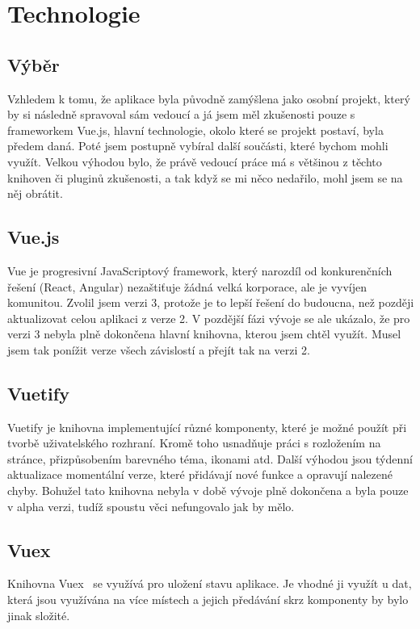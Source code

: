 
\chapter{Technologie}

\section{Výběr}
Vzhledem k tomu, že aplikace byla původně zamýšlena jako osobní projekt, který by si následně spravoval sám vedoucí a já
jsem měl zkušenosti pouze s frameworkem Vue.js, hlavní technologie, okolo které se projekt postaví, byla předem daná. Poté
jsem postupně vybíral další součásti, které bychom mohli využít. Velkou výhodou bylo, že právě vedoucí práce má s většinou
z těchto knihoven či pluginů zkušenosti, a tak když se mi něco nedařilo, mohl jsem se na něj obrátit.

\section{Vue.js}
Vue je progresivní JavaScriptový framework, který narozdíl od konkurenčních řešení (React, Angular) nezaštiťuje žádná velká
korporace, ale je vyvíjen komunitou.\cite{VueJS} Zvolil jsem verzi 3, protože je to lepší řešení do budoucna, než později aktualizovat
celou aplikaci z verze 2. V pozdější fázi vývoje se ale ukázalo, že pro verzi 3 nebyla plně dokončena hlavní knihovna, kterou jsem chtěl využít.
Musel jsem tak ponížit verze všech závislostí a přejít tak na verzi 2.

\section{Vuetify}
Vuetify je knihovna implementující různé komponenty, které je možné použít při tvorbě uživatelského rozhraní. Kromě toho
usnadňuje práci s rozložením na stránce, přizpůsobením barevného téma, ikonami atd. Další výhodou jsou týdenní aktualizace
momentální verze, které přidávají nové funkce a opravují nalezené chyby.\cite{VuetifyWhy}
Bohužel tato knihovna nebyla v době vývoje plně dokončena a byla pouze v alpha verzi, tudíž spoustu věci nefungovalo jak by mělo.

\section{Vuex}
Knihovna Vuex~\cite{Vuex} se využívá pro uložení stavu aplikace. Je vhodné ji využít u dat, která jsou využívána na více místech a jejich
předávání skrz komponenty by bylo jinak složité.


